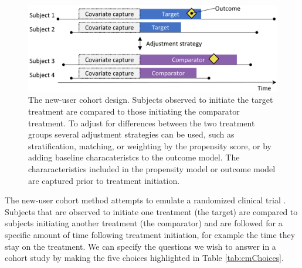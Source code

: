 \documentclass[]{book}
\begin{document}
\begin{figure}

{\centering \includegraphics[width=0.9\linewidth]{images/PopulationLevelEstimation/cohortMethod} 

}

\caption{The new-user cohort design. Subjects observed to initiate the target treatment are compared to those initiating the comparator treatment. To adjust for differences between the two treatment groups several adjustment strategies can be used, such as stratification, matching, or weighting by the propensity score, or by adding baseline characateristcs to the outcome model. The chararacteristics included in the propensity model or outcome model are captured prior to treatment initiation.}\label{fig:cohortMethod}
\end{figure}

The new-user cohort method attempts to emulate a randomized clinical
trial \citep{hernan_2016}. Subjects that are observed to initiate one
treatment (the target) are compared to subjects initiating another
treatment (the comparator) and are followed for a specific amount of
time following treatment initiation, for example the time they stay on
the treatment. We can specify the questions we wish to answer in a
cohort study by making the five choices highlighted in Table
\ref{tab:cmChoices}.
\end{document}
